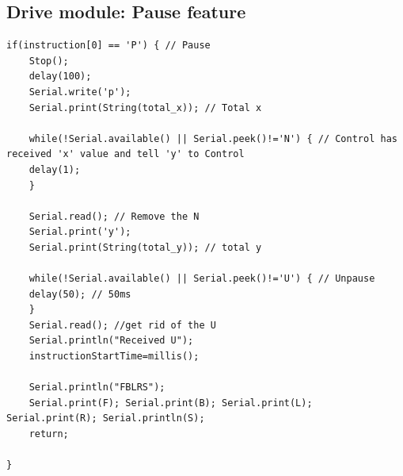 \documentclass[11pt, a4paper]{article}
\begin{document}
\subsection{Drive module: Pause feature}
\begin{lstlisting}
if(instruction[0] == 'P') { // Pause
    Stop();
    delay(100);
    Serial.write('p');
    Serial.print(String(total_x)); // Total x

    while(!Serial.available() || Serial.peek()!='N') { // Control has received 'x' value and tell 'y' to Control
    delay(1);
    }

    Serial.read(); // Remove the N
    Serial.print('y');
    Serial.print(String(total_y)); // total y

    while(!Serial.available() || Serial.peek()!='U') { // Unpause
    delay(50); // 50ms
    }
    Serial.read(); //get rid of the U
    Serial.println("Received U");
    instructionStartTime=millis();

    Serial.println("FBLRS");
    Serial.print(F); Serial.print(B); Serial.print(L); Serial.print(R); Serial.println(S);
    return;

}
\end{lstlisting}
\end{document}
